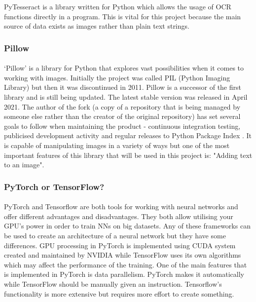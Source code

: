\documentclass[12pt]{report}
\begin{document}
    PyTesseract is a library written for Python which allows the usage of OCR functions directly in a program. This is vital for this project because the main source of data exists as images rather than plain text strings.

    \subsubsection{Pillow}
    \paragraph{}

    `Pillow' is a library for Python that explores vast possibilities when it comes to working with images. Initially the project was called PIL (Python Imaging Library) but then it was discontinued in 2011.
    Pillow is a successor of the first library and is still being updated. The latest stable version was released in April 2021. The author of the fork (a copy of a repository that is being managed by someone else rather than the creator of the original repository) has set several goals to follow when maintaining the product - continuous integration testing, publicised development activity and regular releases to Python Package Index \citep{pillow_about}. 
    It is capable of manipulating images in a variety of ways but one of the most important features of this library that will be used in this project is: "Adding text to an image".

    \subsubsection*{PyTorch or TensorFlow?}
    \paragraph{}

    PyTorch and Tensorflow are both tools for working with neural networks and offer different advantages and disadvantages. They both allow utilising your GPU's power in order to train NNs on big datasets. Any of these frameworks can be used to create an architecture of a neural network but they have some differences.
    GPU processing in PyTorch is implemented using CUDA system created and maintained by NVIDIA while TensorFlow uses its own algorithms which may affect the performance of the training. One of the main features that is implemented in PyTorch is data parallelism. PyTorch makes it automatically while TensorFlow should be manually given an instruction.
    Tensorflow's functionality is more extensive but requires more effort to create something.
\end{document}
